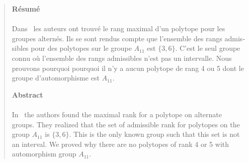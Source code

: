 \cleardoublepage{}

\thispagestyle{plain}

\hspace{3cm}

\begin{quote}

\begin{otherlanguage}{french}

\begin{center}
  \textbf{Résumé}
\end{center}


\paragraph{}
Dans~\cite{highestRankOfAn} les auteurs ont trouvé le rang maximal d'un polytope pour les groupes alternés. Ils se sont rendus compte que l'ensemble des rangs admissibles pour des polytopes sur le groupe $A_{11}$ est $\{3,6\}$. C'est le seul groupe connu où l'ensemble des rangs admissibles n'est pas un intervalle. Nous prouvons pourquoi pourquoi il n'y a aucun polytope de rang 4 ou 5 dont le groupe d'automorphisme est $A_{11}$.

\end{otherlanguage}

\begin{center}
  \textbf{Abstract}
\end{center}

\paragraph{}
In~\cite{highestRankOfAn} the authors found the maximal rank for a polytope on alternate groups. They realized that the set of admissible rank for polytopes on the group $A_{11}$ is $\{3,6\}$. This is the only known group such that this set is not an interval. We proved why there are no polytopes of rank 4 or 5 with automorphism group $A_{11}$.

\end{quote}
